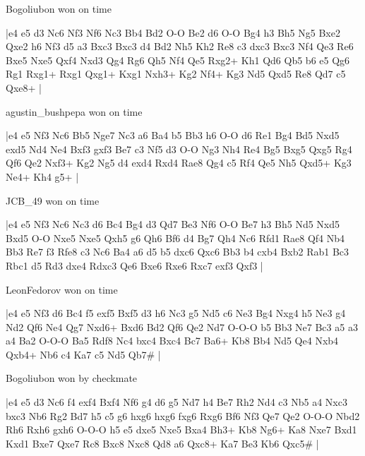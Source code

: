 \showboard

Bogoliubon won on time

\makegametitle
|e4 e5 d3 Nc6 Nf3 Nf6 Nc3 Bb4 Bd2 O-O Be2 d6 O-O Bg4 h3 Bh5 Ng5 Bxe2 Qxe2 h6 Nf3 d5 a3 Bxc3 Bxc3 d4 Bd2 Nh5 Kh2 Re8 c3 dxc3 Bxc3 Nf4 Qe3 Re6 Bxe5 Nxe5 Qxf4 Nxd3 Qg4 Rg6 Qh5 Nf4 Qe5 Rxg2+ Kh1 Qd6 Qb5 b6 e5 Qg6 Rg1 Rxg1+ Rxg1 Qxg1+ Kxg1 Nxh3+ Kg2 Nf4+ Kg3 Nd5 Qxd5 Re8 Qd7 c5 Qxe8+  |

\showboard

agustin\_bushpepa won on time

\makegametitle
|e4 e5 Nf3 Nc6 Bb5 Nge7 Nc3 a6 Ba4 b5 Bb3 h6 O-O d6 Re1 Bg4 Bd5 Nxd5 exd5 Nd4 Ne4 Bxf3 gxf3 Be7 c3 Nf5 d3 O-O Ng3 Nh4 Re4 Bg5 Bxg5 Qxg5 Rg4 Qf6 Qe2 Nxf3+ Kg2 Ng5 d4 exd4 Rxd4 Rae8 Qg4 c5 Rf4 Qe5 Nh5 Qxd5+ Kg3 Ne4+ Kh4 g5+  |

\showboard

JCB\_49 won on time

\makegametitle
|e4 e5 Nf3 Nc6 Nc3 d6 Bc4 Bg4 d3 Qd7 Be3 Nf6 O-O Be7 h3 Bh5 Nd5 Nxd5 Bxd5 O-O Nxe5 Nxe5 Qxh5 g6 Qh6 Bf6 d4 Bg7 Qh4 Nc6 Rfd1 Rae8 Qf4 Nb4 Bb3 Re7 f3 Rfe8 c3 Nc6 Ba4 a6 d5 b5 dxc6 Qxc6 Bb3 b4 cxb4 Bxb2 Rab1 Bc3 Rbc1 d5 Rd3 dxe4 Rdxc3 Qe6 Bxe6 Rxe6 Rxc7 exf3 Qxf3  |

\showboard

LeonFedorov won on time

\makegametitle
|e4 e5 Nf3 d6 Bc4 f5 exf5 Bxf5 d3 h6 Nc3 g5 Nd5 c6 Ne3 Bg4 Nxg4 h5 Ne3 g4 Nd2 Qf6 Ne4 Qg7 Nxd6+ Bxd6 Bd2 Qf6 Qe2 Nd7 O-O-O b5 Bb3 Ne7 Bc3 a5 a3 a4 Ba2 O-O-O Ba5 Rdf8 Nc4 bxc4 Bxc4 Bc7 Ba6+ Kb8 Bb4 Nd5 Qe4 Nxb4 Qxb4+ Nb6 c4 Ka7 c5 Nd5 Qb7\#  |

\showboard

Bogoliubon won by checkmate

\makegametitle
|e4 e5 d3 Nc6 f4 exf4 Bxf4 Nf6 g4 d6 g5 Nd7 h4 Be7 Rh2 Nd4 c3 Nb5 a4 Nxc3 bxc3 Nb6 Rg2 Bd7 h5 c5 g6 hxg6 hxg6 fxg6 Rxg6 Bf6 Nf3 Qe7 Qe2 O-O-O Nbd2 Rh6 Rxh6 gxh6 O-O-O h5 e5 dxe5 Nxe5 Bxa4 Bh3+ Kb8 Ng6+ Ka8 Nxe7 Bxd1 Kxd1 Bxe7 Qxe7 Rc8 Bxc8 Nxc8 Qd8 a6 Qxc8+ Ka7 Be3 Kb6 Qxc5\#  |

